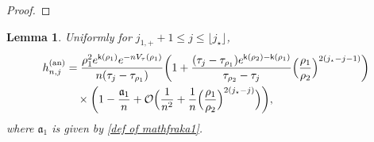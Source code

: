 \documentclass[a4paper]{article}
\newtheorem{lemma}[theorem]{Lemma}
\numberwithin{equation}{section}
\begin{document}
\begin{proof}
\end{proof}

\begin{lemma}
\label{lemma: j1+ j jdiamond}
Uniformly for $j_{1,+}+1\leq j\leq \lfloor j_{\star}\rfloor$,
\begin{align}
\begin{split}
h_{n,j}^{(\mathrm{an})}&=
\frac{\rho_1^2e^{\mathsf{k}(\rho_1)}e^{-nV_{\tau}(\rho_1)}}{n(\tau_j-\tau_{\rho_1})}
\bigg(
1+\frac{(\tau_j-\tau_{\rho_1})e^{\mathsf{k}(\rho_2)-\mathsf{k}(\rho_1)}}{\tau_{\rho_2}-\tau_j}\Bigl( \frac{\rho_1}{\rho_2}\Bigr)^{2(j_{\star}-j-1)}
\bigg)
\\
&\quad
\times\bigg(
1-\frac{\mathfrak{a}_1}{n}+\mathcal{O}\Bigl(\frac{1}{n^2}+\frac{1}{n}\Bigl( \frac{\rho_1}{\rho_2}\Bigr)^{2(j_{\star}-j)}\Bigr)
\bigg),
\end{split}
\end{align}
where $\mathfrak{a}_1$ is given by \eqref{def of mathfraka1}. 
\end{lemma}
\end{document}
